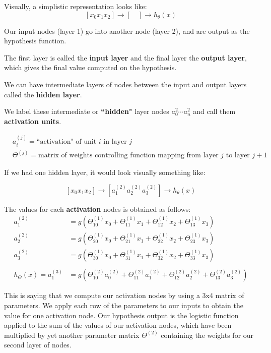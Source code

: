 Visually, a simplistic representation looks like:
\[ [x_0x_1x_2]\rightarrow [\quad] \rightarrow h_\theta (x) \]

Our input nodes (layer 1) go into another node (layer 2), and are output as the hypothesis function.

The first layer is called the \textbf{input layer} and the final layer the \textbf{output layer}, which gives the final value computed on the hypothesis.

We can have intermediate layers of nodes between the input and output layers called the \textbf{hidden layer}.

We label these intermediate or \textbf{``hidden"} layer nodes $a^2_0 \cdots a^2_n $ and call them \textbf{activation units}.

\begin{align*}
& a_i^{(j)} = \text{``activation" of unit $i$ in layer $j$} \\
& \Theta^{(j)} = \text{matrix of weights controlling function mapping from layer $j$ to layer $j+1$}
\end{align*}

If we had one hidden layer, it would look visually something like:

\[ [x_0x_1x_2]\rightarrow [a_1^{(2)}a_2^{(2)}a_3^{(2)}] \rightarrow h_\theta (x) \]

The values for each \textbf{activation} nodes is obtained as follows:
\begin{align*}
a_1^{(2)} &= g(\Theta_{10}^{(1)}x_0 + \Theta_{11}^{(1)}x_1 + \Theta_{12}^{(1)}x_2 + \Theta_{13}^{(1)}x_3) \\
a_2^{(2)} &= g(\Theta_{20}^{(1)}x_0 + \Theta_{21}^{(1)}x_1 + \Theta_{22}^{(1)}x_2 + \Theta_{23}^{(1)}x_3) \\
a_3^{(2)} &= g(\Theta_{30}^{(1)}x_0 + \Theta_{31}^{(1)}x_1 + \Theta_{32}^{(1)}x_2 + \Theta_{33}^{(1)}x_3) \\ \\
h_\Theta(x) = a_1^{(3)} &= g(\Theta_{10}^{(2)}a_0^{(2)} + \Theta_{11}^{(2)}a_1^{(2)} + \Theta_{12}^{(2)}a_2^{(2)} + \Theta_{13}^{(2)}a_3^{(2)})
\end{align*}

This is saying that we compute our activation nodes by using a 3x4 matrix of parameters. We apply each row of the parameters to our inputs to obtain the value for one activation node. Our hypothesis output is the logistic function applied to the sum of the values of our activation nodes, which have been multiplied by yet another parameter matrix $\Theta^{(2)}$ containing the weights for our second layer of nodes.

